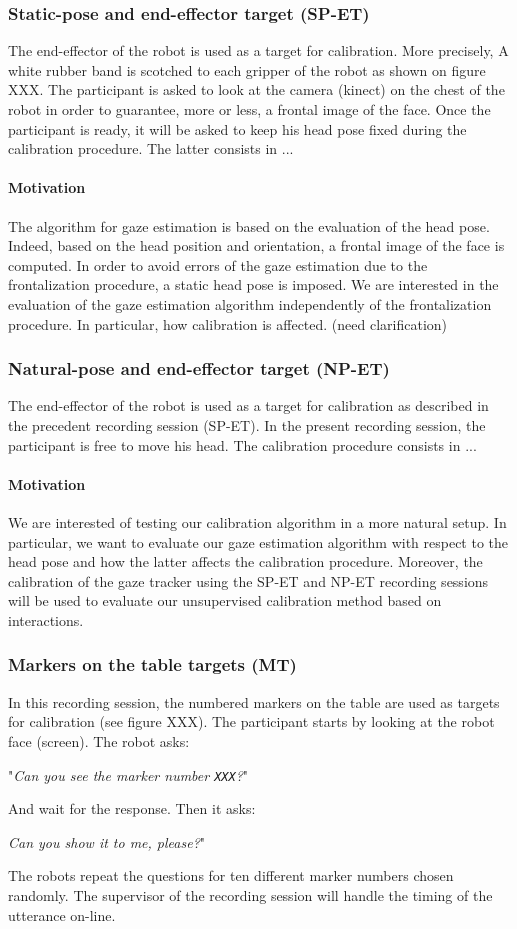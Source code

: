 \documentclass[11pt,a4paper]{article}
\begin{document}
\subsubsection{Static-pose and end-effector target (SP-ET)}
The end-effector of the robot is used as a target for calibration. More precisely, A white rubber band is scotched to each gripper of the robot as shown on figure XXX. The participant is asked to look at the camera (kinect) on the chest of the robot in order to guarantee, more or less, a frontal image of the face. Once the participant is ready, it will be asked to keep his head pose fixed during the calibration procedure. The latter consists in ...
\paragraph{Motivation}
The algorithm for gaze estimation is based on the evaluation of the head pose. Indeed, based on the head position and orientation, a frontal image of the face is computed. In order to avoid errors of the gaze estimation due to the frontalization procedure, a static head pose is imposed. We are interested in the evaluation of the gaze estimation algorithm independently of the frontalization procedure. In particular, how calibration is affected. (need clarification)

\subsubsection{Natural-pose and end-effector target (NP-ET)}
The end-effector of the robot is used as a target for calibration as described in the precedent recording session (SP-ET). In the present recording session, the participant is free to move his head. The calibration procedure consists in ...
\paragraph{Motivation}
We are interested of testing our calibration algorithm in a more natural setup. In particular, we want to evaluate our gaze estimation algorithm with respect to the head pose and how the latter affects the calibration procedure. Moreover, the calibration of the gaze tracker using the SP-ET and NP-ET recording sessions will be used to evaluate our unsupervised calibration method based on interactions.

\subsubsection{Markers on the table targets (MT)}
In this recording session, the numbered markers on the table are used as targets for calibration (see figure XXX). The participant starts by looking at the robot face (screen). The robot asks: 
\begin{center}
"\textit{Can you see the marker number \texttt{XXX}?}" 
\end{center}
And wait for the response. Then it asks: 
\begin{center}
\textit{Can you show it to me, please?}"
\end{center}
The robots repeat the questions for ten different marker numbers chosen randomly. The supervisor of the recording session will handle the timing of the utterance on-line.
\end{document}
